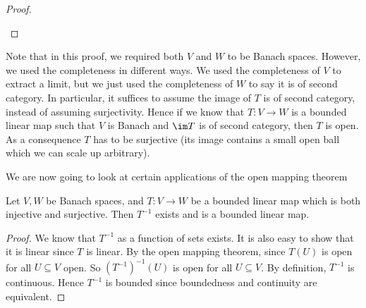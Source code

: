 \documentclass[a4paper]{article}
\begin{document}
\begin{proof}
\begin{enumerate}
%
  \end{enumerate}
\end{proof}
Note that in this proof, we required both $V$ and $W$ to be Banach spaces. However, we used the completeness in different ways. We used the completeness of $V$ to extract a limit, but we just used the completeness of $W$ to say it is of second category. In particular, it suffices to assume the image of $T$ is of second category, instead of assuming surjectivity. Hence if we know that $T: V\to W$ is a bounded linear map such that $V$ is Banach and $\im T$ is of second category, then $T$ is open. As a consequence $T$ has to be surjective (its image contains a small open ball which we can scale up arbitrary).

We are now going to look at certain applications of the open mapping theorem
\begin{thm}
  Let $V, W$ be Banach spaces, and $T: V\to W$ be a bounded linear map which is both injective and surjective. Then $T^{-1}$ exists and is a bounded linear map.
\end{thm}

\begin{proof}
  We know that $T^{-1}$ as a function of sets exists. It is also easy to show that it is linear since $T$ is linear. By the open mapping theorem, since $T(U)$ is open for all $U \subseteq V$ open. So $(T^{-1})^{-1}(U)$ is open for all $U\subseteq V$. By definition, $T^{-1}$ is continuous. Hence $T^{-1}$ is bounded since boundedness and continuity are equivalent.
\end{proof}
\end{document}
